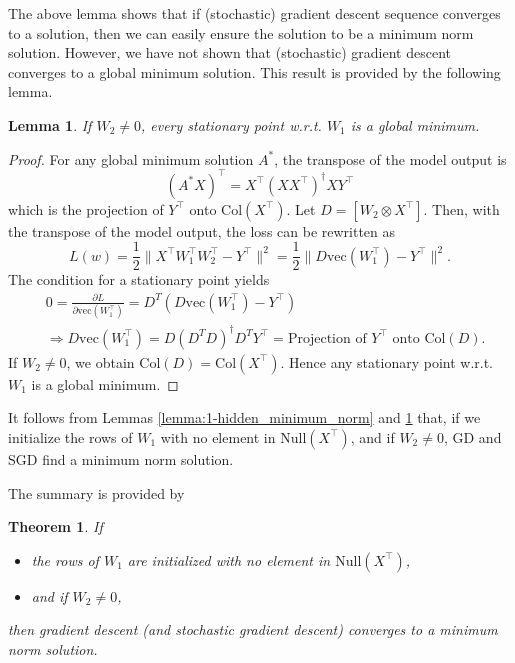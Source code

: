 \documentclass[10pt]{article}
\newtheorem{theorem}{Theorem}
\newtheorem{lemma}{Lemma}
\newcommand{\Col}{\mathrm{Col}}
\newcommand{\Null}{\mathrm{Null}}
\newcommand{\vect}{\mathrm{vec}}
\begin{document}
The above lemma shows that if (stochastic) gradient descent sequence
converges to a solution, then we can easily ensure the solution to be
a minimum norm solution. However, we have not shown that (stochastic)
gradient descent  converges to a global minimum solution. This result
is provided by the following lemma.
 
\begin{lemma} \label{lemma:1-hidden_stationary_equal_global}
If $W_2 \neq 0$, every stationary point w.r.t. $W_1$ is a global minimum.
\end{lemma}
\begin{proof}

For any global minimum solution $A^*$, the transpose of the model output is
$$
(A^{*}X)^{\top}=X^\top (XX^{\top})^{\dagger} XY^\top
$$
\noindent which is the projection of $Y^\top$ onto $\Col(X^{\top})$. Let $D=[W_{2}\otimes X^\top]$. Then, with the transpose of the model output,
the loss can be rewritten as $$
L(w) =\frac{1}{2} \|X^{\top} W_1^\top W_2^\top-Y^\top\|^2= \frac{1}{2} \|D\vect(W_{1}^\top)-Y^\top \|^2.
$$ 
The condition for a stationary point yields
\begin{align*}
  &0=\frac{\partial L}{\partial \vect(W_{1}^\top)} =D^{T}(D \vect(W_1^\top)-Y^\top) \\ & \Rightarrow D\vect(W_{1}^\top)=D(D^TD)^{\dagger} D^T Y^\top  = \text{Projection of $Y^\top$ onto $\Col(D)$}. 
\end{align*}
If $W_2 \neq 0$, we obtain $\Col(D)=\Col(X^{\top})$. Hence
any stationary point w.r.t. $W_1$ is a global minimum. 
\end{proof}

It follows from Lemmas \ref{lemma:1-hidden_minimum_norm} and
\ref{lemma:1-hidden_stationary_equal_global} that, if we initialize
the rows of $W_1$ with no element in $\Null(X^\top)$, and if
$W_2 \neq 0$, GD and SGD find a minimum norm solution.

The summary is provided by 

\begin{theorem} \label{theorem}
If 
\begin{itemize}
\item the rows of $W_1$ are initialized with no element in $\Null(X^\top)$,
\item and if $W_2 \neq 0$, 
\end{itemize}
then gradient descent (and stochastic gradient descent) converges to a minimum norm
solution.
\end{theorem}
\end{document}
